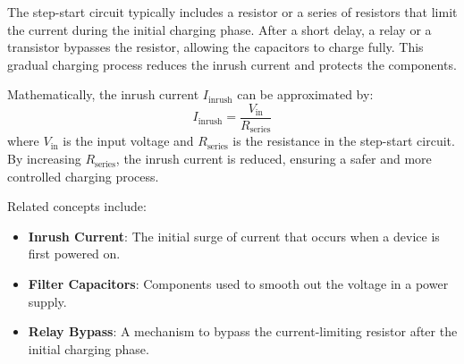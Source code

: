 The step-start circuit typically includes a resistor or a series of resistors that limit the current during the initial charging phase. After a short delay, a relay or a transistor bypasses the resistor, allowing the capacitors to charge fully. This gradual charging process reduces the inrush current and protects the components.

Mathematically, the inrush current \( I_{\text{inrush}} \) can be approximated by:
\[
I_{\text{inrush}} = \frac{V_{\text{in}}}{R_{\text{series}}}
\]
where \( V_{\text{in}} \) is the input voltage and \( R_{\text{series}} \) is the resistance in the step-start circuit. By increasing \( R_{\text{series}} \), the inrush current is reduced, ensuring a safer and more controlled charging process.

Related concepts include:
\begin{itemize}
    \item \textbf{Inrush Current}: The initial surge of current that occurs when a device is first powered on.
    \item \textbf{Filter Capacitors}: Components used to smooth out the voltage in a power supply.
    \item \textbf{Relay Bypass}: A mechanism to bypass the current-limiting resistor after the initial charging phase.
\end{itemize}

